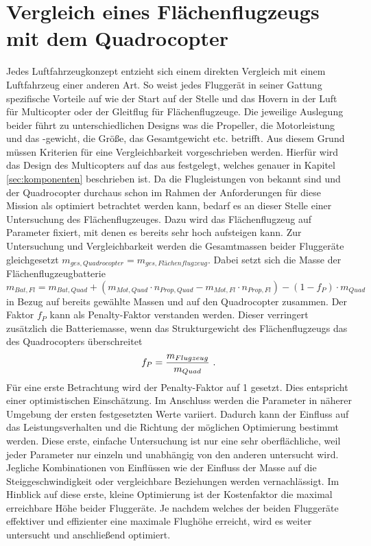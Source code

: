 \chapter{Vergleich eines Flächenflugzeugs mit dem Quadrocopter}
\label{chap:vergleich}
Jedes Luftfahrzeugkonzept entzieht sich einem direkten Vergleich mit einem Luftfahrzeug einer anderen Art. So weist jedes Fluggerät in seiner Gattung spezifische Vorteile auf wie der Start auf der Stelle und das Hovern in der Luft für Multicopter oder der Gleitflug für Flächenflugzeuge. Die jeweilige Auslegung beider führt zu unterschiedlichen Designs was die Propeller, die Motorleistung und das -gewicht, die Größe, das Gesamtgewicht etc. betrifft. Aus diesem Grund müssen Kriterien für eine Vergleichbarkeit vorgeschrieben werden. Hierfür wird das Design des Multicopters auf das aus \cite{Anderson.2018} festgelegt, welches genauer in Kapitel \ref{sec:komponenten} beschrieben ist. Da die Flugleistungen von \cite{Anderson.2018} bekannt sind und der Quadrocopter durchaus schon im Rahmen der Anforderungen für diese Mission als optimiert betrachtet werden kann, bedarf es an dieser Stelle einer Untersuchung des Flächenflugzeuges. Dazu wird das Flächenflugzeug auf Parameter fixiert, mit denen es bereits sehr hoch aufsteigen kann. Zur Untersuchung und Vergleichbarkeit werden die Gesamtmassen beider Fluggeräte gleichgesetzt \ensuremath{m_{ges,Quadrocopter} = m_{ges,Flächenflugzeug}}. Dabei setzt sich die Masse der Flächenflugzeugbatterie   
\begin{equation}
	m_{Bat,Fl} = m_{Bat,Quad} + (m_{Mot,Quad}\cdot n_{Prop,Quad} - m_{Mot,Fl}\cdot n_{Prop,Fl}) - (1-f_P)\cdot m_{Quad}  
\end{equation}
in Bezug auf bereits gewählte Massen und auf den Quadrocopter zusammen. Der Faktor \ensuremath{f_P} kann als Penalty-Faktor verstanden werden. Dieser verringert zusätzlich die Batteriemasse, wenn das Strukturgewicht des Flächenflugzeugs das des Quadrocopters überschreitet
\begin{equation}
	f_P = \frac{m_{Flugzeug}}{m_{Quad}} ~\text{.}
	\label{eq:penalty}
\end{equation} 
Für eine erste Betrachtung wird der Penalty-Faktor auf 1 gesetzt. Dies entspricht einer optimistischen Einschätzung. Im Anschluss werden die Parameter in näherer Umgebung der ersten festgesetzten Werte variiert. Dadurch kann der Einfluss auf das Leistungsverhalten und die Richtung der möglichen Optimierung bestimmt werden. Diese erste, einfache Untersuchung ist nur eine sehr oberflächliche, weil jeder Parameter nur einzeln und unabhängig von den anderen untersucht wird. Jegliche Kombinationen von Einflüssen wie der Einfluss der Masse auf die Steiggeschwindigkeit oder vergleichbare Beziehungen werden vernachlässigt. Im Hinblick auf diese erste, kleine Optimierung ist der Kostenfaktor die maximal erreichbare Höhe beider Fluggeräte. Je nachdem welches der beiden Fluggeräte effektiver und effizienter eine maximale Flughöhe erreicht, wird es weiter untersucht und anschließend optimiert.  

